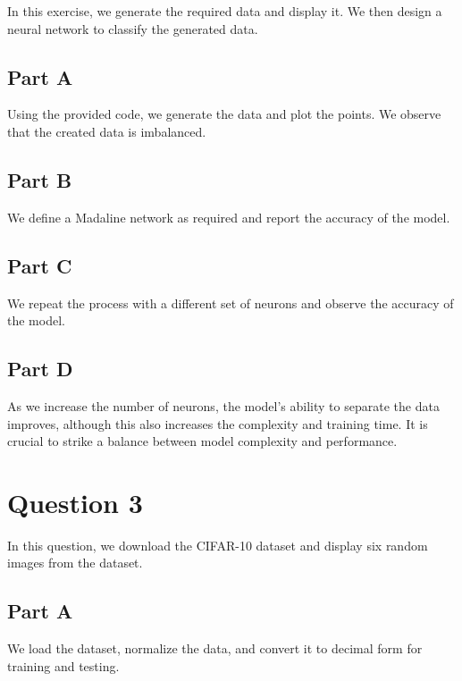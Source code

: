 \documentclass[DIV=calc, paper=a4, fontsize=11pt, twocolumn]{scrartcl}	 %
\begin{document}
    In this exercise, we generate the required data and display it. We then design a neural network to 
    classify the generated data.
    
  \subsection*{\small{Part A}}
    
    Using the provided code, we generate the data and plot the points. We observe that the created data 
    is imbalanced.
    
  \subsection*{\small{Part B}}
    
    We define a Madaline network as required and report the accuracy of the model.
    
  \subsection*{\small{Part C}}
    
    We repeat the process with a different set of neurons and observe the accuracy of the model.
    
  \subsection*{\small{Part D}}
    
    As we increase the number of neurons, the model's ability to separate the data improves, although this 
    also increases the complexity and training time. It is crucial to strike a balance between model complexity 
    and performance.

\section*{\small{Question 3}}

    In this question, we download the CIFAR-10 dataset and display six random images from the dataset.
    
  \subsection*{Part A}
    
    We load the dataset, normalize the data, and convert it to decimal form for training and testing.
    
\end{document}
